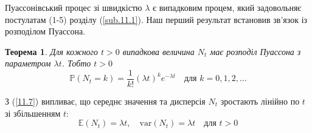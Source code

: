 \documentclass[12pt,fleqn]{article}
\newtheorem{theorem}{Теорема}[section]
\numberwithin{figure}{section}
\numberwithin{equation}{section}
\begin{document}
Пуассонівський процес зі швидкістю $\lambda$ є випадковим процем, який задовольняє постулатам (1-5) розділу (\ref{sub.11.1}). Наш перший результат встановив зв'язок із розподілом Пуассона.

\begin{theorem}\label{theorem.11.6}
  Для кожного $t>0$ випадкова величина $N_t$ має розподіл Пуассона з параметром $\lambda t$. Тобто $t>0$
  \begin{equation}\label{11.7}
    \mathbb{P}(N_t=k)=\frac{1}{k!}(\lambda t)^{k}e^{-\lambda t} \quad \text{для } k = 0, 1, 2, \dots
  \end{equation}
\end{theorem}

З (\ref{11.7}) випливає, що середнє значення та дисперсія $N_t$ зростають лінійно по $t$ зі збільшенням $t$:
\begin{equation}\label{11.8}
  \mathbb{E}(N_t)=\lambda t, \quad \text{var}(N_t)=\lambda t \quad \text{для } t>0
\end{equation}
\end{document}

